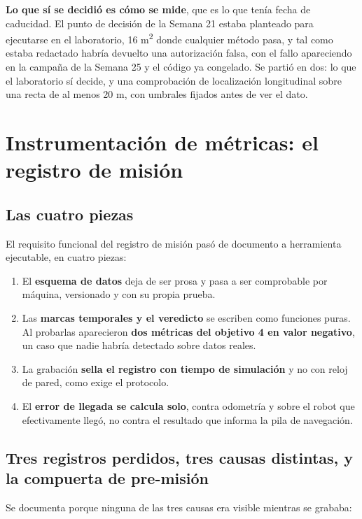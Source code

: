 \documentclass[12pt,letterpaper]{article}
\begin{document}
\textbf{Lo que sí se decidió es cómo se mide}, que es lo que tenía fecha de caducidad. El punto de decisión de la Semana 21 estaba planteado para ejecutarse en el laboratorio, 16 m\textsuperscript{2} donde cualquier método pasa, y tal como estaba redactado habría devuelto una autorización falsa, con el fallo apareciendo en la campaña de la Semana 25 y el código ya congelado. Se partió en dos: lo que el laboratorio sí decide, y una comprobación de localización longitudinal sobre una recta de al menos 20 m, con umbrales fijados antes de ver el dato.

\section{Instrumentación de métricas: el registro de misión}
\label{sec:registro}

\subsection{Las cuatro piezas}

El requisito funcional del registro de misión pasó de documento a herramienta ejecutable, en cuatro piezas:

\begin{enumerate}
    \item El \textbf{esquema de datos} deja de ser prosa y pasa a ser comprobable por máquina, versionado y con su propia prueba.
    \item Las \textbf{marcas temporales y el veredicto} se escriben como funciones puras. Al probarlas aparecieron \textbf{dos métricas del objetivo 4 en valor negativo}, un caso que nadie habría detectado sobre datos reales.
    \item La grabación \textbf{sella el registro con tiempo de simulación} y no con reloj de pared, como exige el protocolo.
    \item El \textbf{error de llegada se calcula solo}, contra odometría y sobre el robot que efectivamente llegó, no contra el resultado que informa la pila de navegación.
\end{enumerate}

\subsection{Tres registros perdidos, tres causas distintas, y la compuerta de pre-misión}

Se documenta porque ninguna de las tres causas era visible mientras se grababa:
\end{document}
